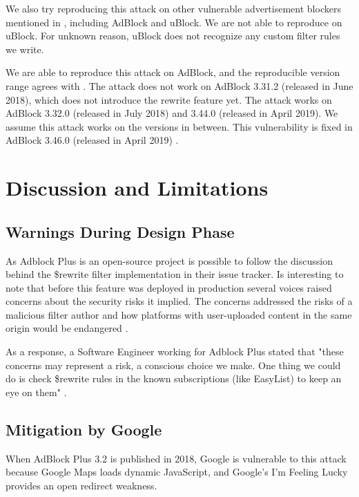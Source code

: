 \documentclass[conference]{IEEEtran}
\begin{document}
We also try reproducing this attack on other vulnerable advertisement blockers mentioned in \cite{abp_code_injection}, including AdBlock and uBlock. We are not able to reproduce on uBlock. For unknown reason, uBlock does not recognize any custom filter rules we write.

We are able to reproduce this attack on AdBlock, and the reproducible version range agrees with \cite{abp_code_injection}. The attack does not work on AdBlock 3.31.2 (released in June 2018), which does not introduce the rewrite feature yet. The attack works on AdBlock 3.32.0 (released in July 2018) and 3.44.0 (released in April 2019). We assume this attack works on the versions in between. This vulnerability is fixed in AdBlock 3.46.0 (released in April 2019) \cite{cr4chrome_ab}.

\section{Discussion and Limitations}

\subsection{Warnings During Design Phase}

As Adblock Plus is an open-source project is possible to follow the discussion behind the \$rewrite filter implementation in their issue tracker. Is interesting to note that before this feature was deployed in production several voices raised concerns about the security risks it implied. 
The concerns addressed the risks of a malicious filter author and how platforms with user-uploaded content in the same origin would be endangered \cite{abp_issue_6622}.

As a response, a Software Engineer working for Adblock Plus stated that "these concerns may represent a risk, a conscious choice we make. One thing we could do is check \$rewrite rules in the known subscriptions (like EasyList) to keep an eye on them" \cite{abp_issue_6622}.

\subsection{Mitigation by Google}
\label{subsec:google_mitigate}

When AdBlock Plus 3.2 is published in 2018, Google is vulnerable to this attack because Google Maps loads dynamic JavaScript, and Google's I'm Feeling Lucky provides an open redirect weakness.
\end{document}
